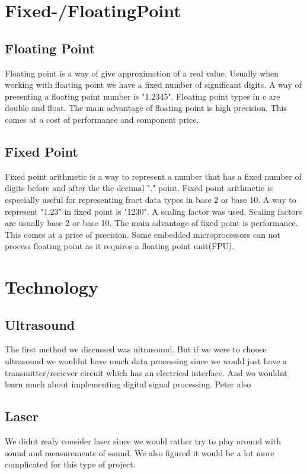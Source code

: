 \section{Fixed-/FloatingPoint}
\subsection{Floating Point}
Floating point is a way of give approximation of a real value. Usually when working with floating point we have a fixed number of significant digits. A way of presenting a floating point number is "1.2345". Floating point types in c are double and float. The main advantage of floating point is high precision. This comes at a cost of performance and component price.\\
\subsection{Fixed Point}
Fixed point arithmetic is a way to represent a number that has a fixed number of digits before and after the the decimal "." point. Fixed point arithmetic is especially useful for representing fract data types in base 2 or base 10. A way to represent "1.23" in fixed point is "1230". A scaling factor was used. Scaling factors are usually base 2 or base 10. The main advantage of fixed point is performance. This comes at a price of precision. Some embedded microprocessors can not process floating point as it requires a floating point unit(FPU).\\

\section{Technology}
\subsection{Ultrasound}
The first method we discussed was ultrasound. But if we were to choose ultrasound we wouldnt have much data processing since we would just have a transmitter/reciever circuit which has an electrical interface. And wo wouldnt learn much about implementing digital signal processing. Peter also 

\subsection{Laser}
We didnt realy consider laser since we would rather try to play around with sound and measurements of sound. We also figured it would be a lot more complicated for this type of project.

